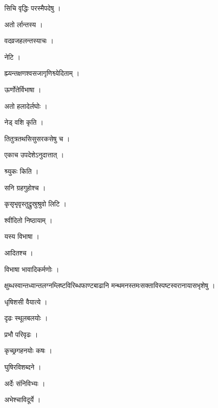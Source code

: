 \documentclass[10pt, openany]{book}
\begin{document}
\noindent सिचि वृद्धिः परस्मैपदेषु ।

\noindent अतो र्लान्तस्य ।

\noindent वदव्रजहलन्तस्याचः ।

\noindent नेटि ।

\noindent ह्म्यन्तक्षणश्वसजागृणिश्व्येदिताम् ।

\noindent ऊर्णोतेर्विभाषा ।

\noindent अतो हलादेर्लघोः ।

\noindent नेड् वशि कृति ।

\noindent तितुत्रतथसिसुसरकसेषु च ।

\noindent एकाच उपदेशेऽनुदात्तात् ।

\noindent श्र्युकः किति ।

\noindent सनि ग्रहगुहोश्च ।

\noindent कृसृभृवृस्तुद्रुस्रुश्रुवो लिटि ।

\noindent श्वीदितो निष्ठायाम् ।

\noindent यस्य विभाषा ।

\noindent आदितश्च ।

\noindent विभाषा भावादिकर्मणोः ।

\noindent क्षुब्धस्वान्तध्वान्तलग्नम्लिष्टविरिब्धफाण्टबाढानि मन्थमनस्तमःसक्ताविस्पष्टस्वरानायासभृशेषु ।

\noindent धृषिशसी वैयात्ये ।

\noindent दृढः स्थूलबलयोः ।

\noindent प्रभौ परिवृढः ।

\noindent कृच्छ्रगहनयोः कषः ।

\noindent घुषिरविशब्दने ।

\noindent अर्देः संनिविभ्यः ।

\noindent अभेश्चाविदूर्ये ।
\end{document}
